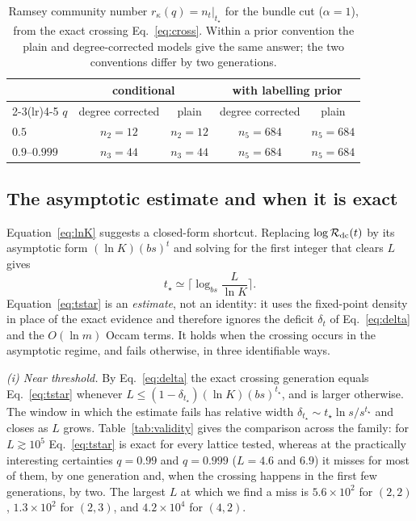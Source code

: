 \documentclass[preprint,12pt]{elsarticle}
\newcommand{\Rev}{\mathcal{R}}
\newcommand{\logR}{\log \Rev}
\newcommand{\rk}{r_{\kappa}}
\newcommand{\Nof}{n_t}
\begin{document}
\begin{table}[tb]
  \centering
  \caption{Ramsey community number $\rk(q)=\Nof|_{t_\star}$ for the bundle cut
  ($\alpha=1$), from the exact crossing Eq.~\eqref{eq:cross}. Within a prior
  convention the plain and degree-corrected models give the same answer; the
  two conventions differ by two generations.}
  \label{tab:rk}
  \begin{tabular}{lcccc}
    \toprule
    & \multicolumn{2}{c}{conditional} &
      \multicolumn{2}{c}{with labelling prior}\\
    \cmidrule(lr){2-3}\cmidrule(lr){4-5}
    $q$ & degree corrected & plain & degree corrected & plain\\
    \midrule
    $0.5$          & $n_2=12$ & $n_2=12$ & $n_5=684$ & $n_5=684$\\
    $0.9$--$0.999$ & $n_3=44$ & $n_3=44$ & $n_5=684$ & $n_5=684$\\
    \bottomrule
  \end{tabular}
\end{table}

\subsection{The asymptotic estimate and when it is exact}
\label{sec:asymptotic}

Equation~\eqref{eq:lnK} suggests a closed-form shortcut. Replacing
$\logR_{\rm dc}(t)$ by its asymptotic form $(\ln K)(bs)^t$ and solving for the
first integer that clears $L$ gives
\begin{equation}
  t_\star \simeq \Big\lceil
    \log_{bs}\frac{L}{\ln K}
  \Big\rceil .
  \label{eq:tstar}
\end{equation}
Equation~\eqref{eq:tstar} is an \emph{estimate}, not an identity: it uses the
fixed-point density in place of the exact evidence and therefore ignores the
deficit $\delta_t$ of Eq.~\eqref{eq:delta} and the $O(\ln m)$ Occam terms. It
holds when the crossing occurs in the asymptotic regime, and fails otherwise,
in three identifiable ways.

\emph{(i) Near threshold.} By Eq.~\eqref{eq:delta} the exact crossing generation
equals Eq.~\eqref{eq:tstar} whenever
$L\le(1-\delta_{t_\star})(\ln K)(bs)^{t_\star}$, and is larger otherwise. The
window in which the estimate fails has relative width $\delta_{t_\star}\sim
t_\star\ln s/s^{t_\star}$ and closes as $L$ grows. Table~\ref{tab:validity}
gives the comparison across the family: for $L\gtrsim10^5$
Eq.~\eqref{eq:tstar} is exact for every lattice tested, whereas at the
practically interesting certainties $q=0.99$ and $q=0.999$ ($L=4.6$ and $6.9$)
it misses for most of them, by one generation and, when the crossing happens in
the first few generations, by two. The largest $L$ at which we find a miss is
$5.6\times10^2$ for $(2,2)$, $1.3\times10^2$ for $(2,3)$, and
$4.2\times10^4$ for $(4,2)$.
\end{document}
